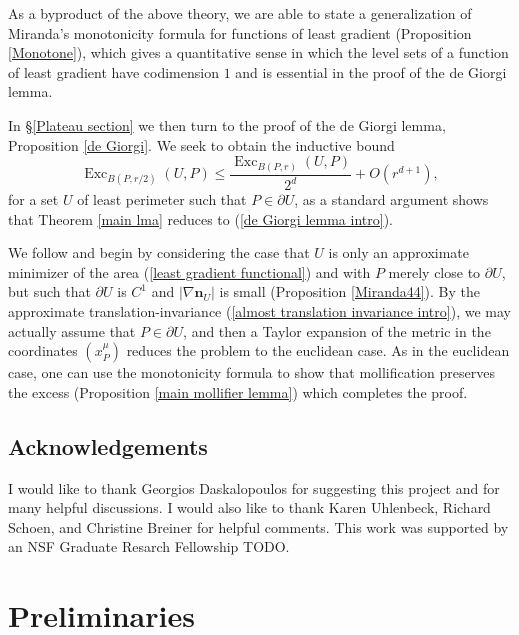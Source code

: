 \documentclass[reqno,11pt]{amsart}
\DeclareMathOperator{\Exc}{Exc}
\newcommand{\normal}{\mathbf n}
\theoremstyle{definition}
\numberwithin{equation}{section}
\begin{document}
As a byproduct of the above theory, we are able to state a generalization of Miranda's monotonicity formula \cite[Teorema 3.2]{Miranda66} for functions of least gradient (Proposition \ref{Monotone}), which gives a quantitative sense in which the level sets of a function of least gradient have codimension $1$ and is essential in the proof of the de Giorgi lemma.

In \S\ref{Plateau section} we then turn to the proof of the de Giorgi lemma, Proposition \ref{de Giorgi}.
We seek to obtain the inductive bound
\begin{equation}\label{de Giorgi lemma intro}
\Exc_{B(P, r/2)}(U, P) \leq \frac{\Exc_{B(P, r)}(U, P)}{2^d} + O(r^{d + 1}),
\end{equation}
for a set $U$ of least perimeter such that $P \in \partial U$, as a standard argument shows that Theorem \ref{main lma} reduces to (\ref{de Giorgi lemma intro}).

We follow \cite[Chapters 6-7]{Giusti77} and begin by considering the case that $U$ is only an approximate minimizer of the area (\ref{least gradient functional}) and with $P$ merely close to $\partial U$, but such that $\partial U$ is $C^1$ and $|\nabla \normal_U|$ is small (Proposition \ref{Miranda44}).
By the approximate translation-invariance (\ref{almost translation invariance intro}), we may actually assume that $P \in \partial U$, and then a Taylor expansion of the metric in the coordinates $(x^\mu_P)$ reduces the problem to the euclidean case.
As in the euclidean case, one can use the monotonicity formula to show that mollification preserves the excess (Proposition \ref{main mollifier lemma}) which completes the proof.



\subsection{Acknowledgements}
I would like to thank Georgios Daskalopoulos for suggesting this project and for many helpful discussions.
I would also like to thank Karen Uhlenbeck, Richard Schoen, and Christine Breiner for helpful comments.
This work was supported by an NSF Graduate Resarch Fellowship TODO.



\section{Preliminaries}\label{Prelims}
\end{document}
